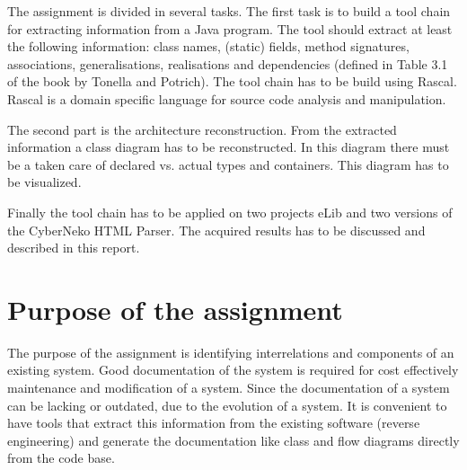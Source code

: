 The assignment is divided in several tasks. The first task is to build a tool chain for extracting information from a Java program. The tool should extract at least the following information: class names, (static) fields, method signatures, associations, generalisations, realisations and dependencies (defined in Table 3.1 of the book by Tonella and Potrich). The tool chain has to be build using Rascal. Rascal is a domain specific language for source code analysis and manipulation.

The second part is the architecture reconstruction. From the extracted information a class diagram has to be reconstructed. In this diagram there must be a taken care of declared vs. actual types and containers. This diagram has to be visualized.

Finally the tool chain has to be applied on two projects eLib and two versions of the CyberNeko HTML Parser. The acquired results has to be discussed and described in this report.

\section*{Purpose of the assignment}
The purpose of the assignment is identifying interrelations and components of an existing system. Good documentation of the system is required for cost effectively maintenance and modification of a system. Since the documentation of a system can be lacking or outdated, due to the evolution of a system. It is convenient to have tools that extract this information from the existing software (reverse engineering) and generate the documentation like class and flow diagrams directly from the code base. 